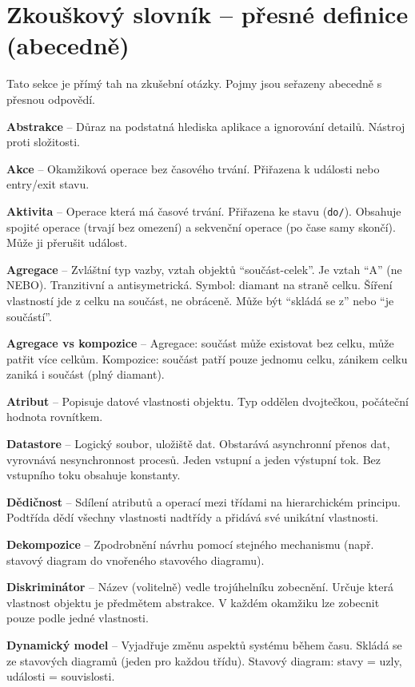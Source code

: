 \documentclass[12pt, a4paper]{article}
\begin{document}
\newpage
\section{Zkouškový slovník -- přesné definice (abecedně)}

Tato sekce je přímý tah na zkušební otázky. Pojmy jsou seřazeny abecedně s přesnou odpovědí.

\textbf{Abstrakce} -- Důraz na podstatná hlediska aplikace a ignorování detailů. Nástroj proti složitosti.

\textbf{Akce} -- Okamžiková operace bez časového trvání. Přiřazena k události nebo entry/exit stavu.

\textbf{Aktivita} -- Operace která má časové trvání. Přiřazena ke stavu (\texttt{do/}). Obsahuje spojité operace (trvají bez omezení) a sekvenční operace (po čase samy skončí). Může ji přerušit událost.

\textbf{Agregace} -- Zvláštní typ vazby, vztah objektů ``součást-celek''. Je vztah ``A'' (ne NEBO). Tranzitivní a antisymetrická. Symbol: diamant na straně celku. Šíření vlastností jde z celku na součást, ne obráceně. Může být ``skládá se z'' nebo ``je součástí''.

\textbf{Agregace vs kompozice} -- Agregace: součást může existovat bez celku, může patřit více celkům. Kompozice: součást patří pouze jednomu celku, zánikem celku zaniká i součást (plný diamant).

\textbf{Atribut} -- Popisuje datové vlastnosti objektu. Typ oddělen dvojtečkou, počáteční hodnota rovnítkem.

\textbf{Datastore} -- Logický soubor, uložiště dat. Obstarává asynchronní přenos dat, vyrovnává nesynchronnost procesů. Jeden vstupní a jeden výstupní tok. Bez vstupního toku obsahuje konstanty.

\textbf{Dědičnost} -- Sdílení atributů a operací mezi třídami na hierarchickém principu. Podtřída dědí všechny vlastnosti nadtřídy a přidává své unikátní vlastnosti.

\textbf{Dekompozice} -- Zpodrobnění návrhu pomocí stejného mechanismu (např. stavový diagram do vnořeného stavového diagramu).

\textbf{Diskriminátor} -- Název (volitelně) vedle trojúhelníku zobecnění. Určuje která vlastnost objektu je předmětem abstrakce. V každém okamžiku lze zobecnit pouze podle jedné vlastnosti.

\textbf{Dynamický model} -- Vyjadřuje změnu aspektů systému během času. Skládá se ze stavových diagramů (jeden pro každou třídu). Stavový diagram: stavy = uzly, události = souvislosti.
\end{document}
